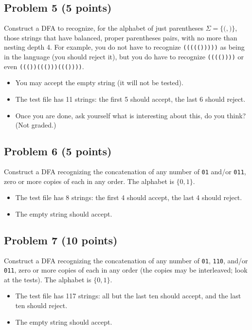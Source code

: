 \documentclass[11pt]{article}
\begin{document}
\subsection*{Problem 5 (5 points)}
Construct a DFA to recognize, for the alphabet of just parentheses $\Sigma=\{\texttt{(},\texttt{)}\}$,
those strings that have balanced, proper parentheses pairs, with no more than nesting depth 4.
For example, you do not have to recognize \texttt{((((()))))} as being in the language (you
should reject it), but you do have to recognize \texttt{(((())))} or even
\texttt{((())((()))((())))}.
\begin{itemize}
  \item You may accept the empty string (it will not be tested).
  \item The test file has 11 strings: the first 5 should accept, the last 6 should reject.
  \item Once you are done, ask yourself what is interesting about this, do you think? (Not graded.)
\end{itemize}

\subsection*{Problem 6 (5 points)}
Construct a DFA recognizing the concatenation of any number of \texttt{01} and/or \texttt{011},
zero or more copies of each in any order. The alphabet is $\{0,1\}$.
\begin{itemize}
  \item The test file has 8 strings: the first 4 should accept, the last 4 should reject.
  \item The empty string should accept.
\end{itemize}

\subsection*{Problem 7 (10 points)}
Construct a DFA recognizing the concatenation of any number of \texttt{01}, \texttt{110},
and/or \texttt{011}, zero or more copies of each in any order (the copies may be interleaved;
look at the tests). The alphabet is $\{0,1\}$.
\begin{itemize}
  \item The test file has 117 strings: all but the last ten should accept, and the last ten
        should reject.
  \item The empty string should accept.
\end{itemize}
\end{document}
